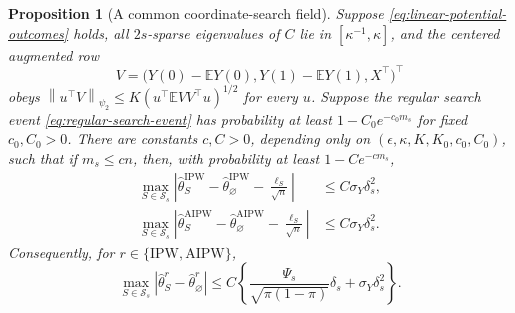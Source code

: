 \documentclass[a4paper,10pt,english]{article}
\newtheorem{proposition}{Proposition}[section]
\newcommand{\E}{\mathbb E}
\newcommand{\norm}[1]{\left\lVert #1\right\rVert}
\begin{document}
\begin{proposition}[A common coordinate-search field]
\label{prop:coordinate-upper-bound}
Suppose \eqref{eq:linear-potential-outcomes} holds, all $2s$-sparse
eigenvalues of $C$ lie in $[\kappa^{-1},\kappa]$, and the centered augmented
row
\begin{equation*}
 V=\bigl(Y(0)-\E Y(0),Y(1)-\E Y(1),X^\top\bigr)^\top
\end{equation*}
obeys $\norm{u^\top V}_{\psi_2}\le K(u^\top\E VV^\top u)^{1/2}$ for every
$u$.  Suppose the regular search event \eqref{eq:regular-search-event} has
probability at least $1-C_0e^{-c_0m_s}$ for fixed $c_0,C_0>0$.
There are constants $c,C>0$, depending only on
$(\epsilon,\kappa,K,K_0,c_0,C_0)$, such that if $m_s\le cn$, then, with
probability at least $1-Ce^{-cm_s}$,
\begin{align}
 \max_{S\in\mathcal S_s}
 \left|\hat\theta_S^{\mathrm{IPW}}
 -\hat\theta_\varnothing^{\mathrm{IPW}}
 -\frac{\ell_S}{\sqrt n}\right|
 &\le C\sigma_Y\delta_s^2,
 \label{eq:ipw-coordinate-expansion}\\
 \max_{S\in\mathcal S_s}
 \left|\hat\theta_S^{\mathrm{AIPW}}
 -\hat\theta_\varnothing^{\mathrm{AIPW}}
 -\frac{\ell_S}{\sqrt n}\right|
 &\le C\sigma_Y\delta_s^2.
 \label{eq:aipw-coordinate-expansion}
\end{align}
Consequently, for $r\in\{\mathrm{IPW},\mathrm{AIPW}\}$,
\begin{equation}\label{eq:coordinate-upper-bound}
 \max_{S\in\mathcal S_s}
 |\hat\theta_S^r-\hat\theta_\varnothing^r|
 \le C\left\{
 \frac{\Psi_s}{\sqrt{\pi(1-\pi)}}\delta_s
 +\sigma_Y\delta_s^2\right\}.
\end{equation}
\end{proposition}
\end{document}
